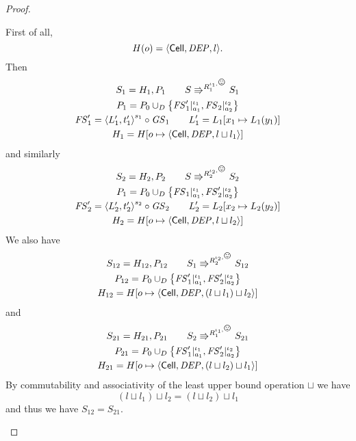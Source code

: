 \begin{proof}
\begin{description}
      First of all,
      \begin{equation}
        H(o) = \mbox{$\langle \mbox{$\mathsf{Cell}$}{}, \mathit{DEP}, l \rangle$}.
      \end{equation}
      Then
      \begin{equation}
        \begin{gathered}
          S_1 = H_1, P_1 \andalso S \Rrightarrow^{R_1^{\iota_1, \smiley}} S_1
          \\
          P_1 = P_0 \cup_D \left\{ \FS'_1|_{a_1}^{\iota_1},
          \FS_2|_{a_2}^{\iota_2} \right\} \\
          \FS'_1 = \xframe{L'_1, t'_1}^{s_1} \circ \GS_1  \andalso L'_1 = L_1[x_1 \mapsto
          L_1(y_1)] \\
          H_1 = H[o \mapsto \Cell{\DEP, l \sqcup l_1}]
        \end{gathered}
      \end{equation}
      and similarly
      \begin{equation}
        \begin{gathered}
          S_2 = H_2, P_2 \andalso S \Rrightarrow^{R_2^{\iota_2, \smiley}} S_2
          \\
          P_1 = P_0 \cup_D \left\{ \FS_1|_{a_1}^{\iota_1},
          \FS'_2|_{a_2}^{\iota_2} \right\} \\
          \FS'_2 = \xframe{L'_2, t'_2}^{s_2} \circ \GS_2  \andalso L'_2 = L_2[x_2 \mapsto
          L_2(y_2)] \\
          H_2 = H[o \mapsto \Cell{\DEP, l \sqcup l_2}]
        \end{gathered}
      \end{equation}
      We also have
      \begin{equation}
        \begin{gathered}
          S_{12} = H_{12}, P_{12} \andalso S_1 \Rrightarrow^{R_2^{\iota_2,
          \smiley}} S_{12}
          \\
          P_{12} = P_0 \cup_D \left\{ \FS'_1|_{a_1}^{\iota_1},
          \FS'_2|_{a_2}^{\iota_2} \right\} \\
          H_{12} = H[o \mapsto \Cell{\DEP, (l \sqcup l_1) \sqcup l_2}]
        \end{gathered}
      \end{equation}
      and
      \begin{equation}
        \begin{gathered}
          S_{21} = H_{21}, P_{21} \andalso S_2 \Rrightarrow^{R_1^{\iota_1,
          \smiley}} S_{21}
          \\
          P_{21} = P_0 \cup_D \left\{ \FS'_1|_{a_1}^{\iota_1},
          \FS'_2|_{a_2}^{\iota_2} \right\} \\
          H_{21} = H[o \mapsto \Cell{\DEP, (l \sqcup l_2) \sqcup l_1}]
        \end{gathered}
      \end{equation}
      By commutability and associativity of the least upper bound operation
      $\sqcup$ we have
      \begin{equation}
        (l \sqcup l_1) \sqcup l_2 = (l \sqcup l_2) \sqcup l_1
      \end{equation}
      and thus we have $S_{12} = S_{21}$.


\end{description}
\end{proof}
